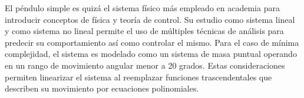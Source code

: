 
El péndulo simple es quizá el sistema físico más empleado en 
academia para introducir conceptos de física y teoría de control.
Su estudio como sistema lineal y como sistema no lineal permite el
uso de múltiples técnicas de análisis para predecir su comportamiento
así como controlar el mismo. Para el caso de mínima complejidad, 
el sistema es modelado como un sistema de masa puntual 
operando en un rango de movimiento angular menor a 20 grados.
Estas consideraciones permiten linearizar el sistema al 
reemplazar funciones trascendentales que describen 
su movimiento por ecuaciones polinomiales.
